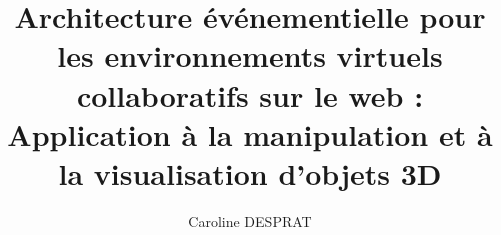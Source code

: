\documentclass{book}
\title{\textbf{\large Architecture \'ev\'enementielle pour les environnements virtuels 
collaboratifs sur le web : Application \`a la manipulation et \`a la visualisation 
d'objets 3D}}
\author{Caroline DESPRAT}
\begin{document}
    \makeflyleaf
\end{document}
